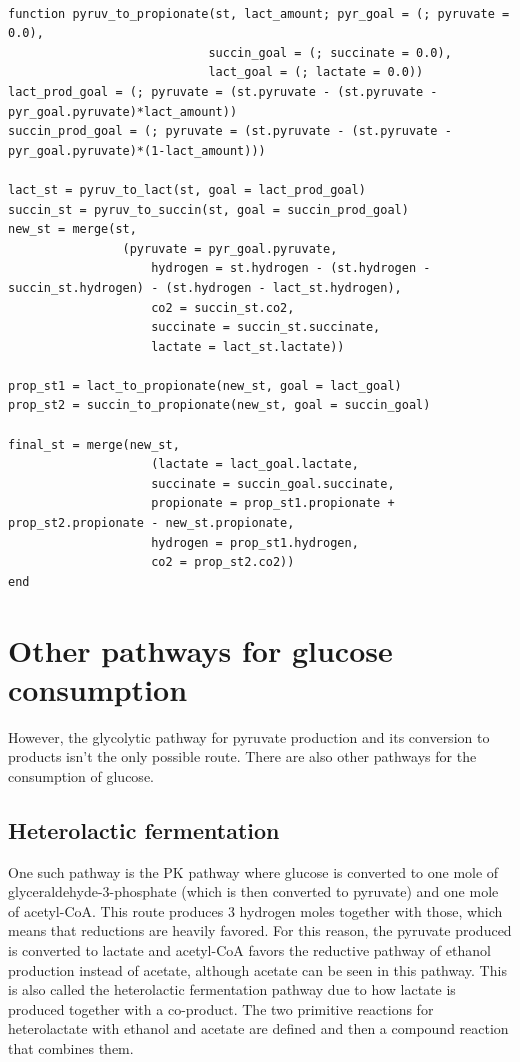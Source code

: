 \documentclass[11pt]{article}
\begin{document}
\begin{verbatim}

function pyruv_to_propionate(st, lact_amount; pyr_goal = (; pyruvate = 0.0),
                            succin_goal = (; succinate = 0.0),
                            lact_goal = (; lactate = 0.0))
lact_prod_goal = (; pyruvate = (st.pyruvate - (st.pyruvate - pyr_goal.pyruvate)*lact_amount))
succin_prod_goal = (; pyruvate = (st.pyruvate - (st.pyruvate - pyr_goal.pyruvate)*(1-lact_amount)))

lact_st = pyruv_to_lact(st, goal = lact_prod_goal)
succin_st = pyruv_to_succin(st, goal = succin_prod_goal)
new_st = merge(st,
                (pyruvate = pyr_goal.pyruvate,
                    hydrogen = st.hydrogen - (st.hydrogen - succin_st.hydrogen) - (st.hydrogen - lact_st.hydrogen),
                    co2 = succin_st.co2,
                    succinate = succin_st.succinate,
                    lactate = lact_st.lactate))

prop_st1 = lact_to_propionate(new_st, goal = lact_goal)
prop_st2 = succin_to_propionate(new_st, goal = succin_goal)

final_st = merge(new_st,
                    (lactate = lact_goal.lactate,
                    succinate = succin_goal.succinate,
                    propionate = prop_st1.propionate + prop_st2.propionate - new_st.propionate,
                    hydrogen = prop_st1.hydrogen,
                    co2 = prop_st2.co2))
end

\end{verbatim}

\section{Other pathways for glucose consumption}
\label{sec:org5c2afc5}
However, the glycolytic pathway for pyruvate production and its conversion to products isn't the only possible route. There are also other pathways for the consumption of glucose.

\subsection{Heterolactic fermentation}
\label{sec:org518b794}
One such pathway is the PK pathway where glucose is converted to one mole of glyceraldehyde-3-phosphate (which is then converted to pyruvate) and one mole of acetyl-CoA. This route produces 3 hydrogen moles together with those, which means that reductions are heavily favored. For this reason, the pyruvate produced is converted to lactate and acetyl-CoA favors the reductive pathway of ethanol production instead of acetate, although acetate can be seen in this pathway. This is also called the heterolactic fermentation pathway due to how lactate is produced together with a co-product. The two primitive reactions for heterolactate with ethanol and acetate are defined and then a compound reaction that combines them.
\end{document}
